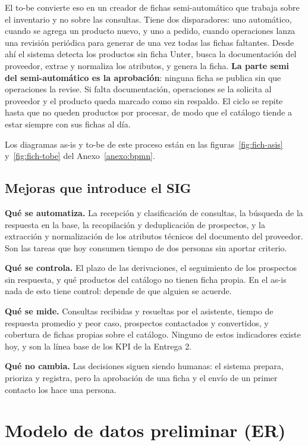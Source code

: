 \documentclass{article}
\begin{document}
El to-be convierte eso en un creador de fichas semi-automático que trabaja sobre el inventario y no sobre las consultas. Tiene dos disparadores: uno automático, cuando se agrega un producto nuevo, y uno a pedido, cuando operaciones lanza una revisión periódica para generar de una vez todas las fichas faltantes. Desde ahí el sistema detecta los productos sin ficha Unter, busca la documentación del proveedor, extrae y normaliza los atributos, y genera la ficha. \textbf{La parte semi del semi-automático es la aprobación}: ninguna ficha se publica sin que operaciones la revise. Si falta documentación, operaciones se la solicita al proveedor y el producto queda marcado como sin respaldo. El ciclo se repite hasta que no queden productos por procesar, de modo que el catálogo tiende a estar siempre con sus fichas al día.

Los diagramas as-is y to-be de este proceso están en las figuras~\ref{fig:fich-asis} y~\ref{fig:fich-tobe} del Anexo~\ref{anexo:bpmn}.

\subsection{Mejoras que introduce el SIG}

\textbf{Qué se automatiza.} La recepción y clasificación de consultas, la búsqueda de la respuesta en la base, la recopilación y deduplicación de prospectos, y la extracción y normalización de los atributos técnicos del documento del proveedor. Son las tareas que hoy consumen tiempo de dos personas sin aportar criterio.

\textbf{Qué se controla.} El plazo de las derivaciones, el seguimiento de los prospectos sin respuesta, y qué productos del catálogo no tienen ficha propia. En el as-is nada de esto tiene control: depende de que alguien se acuerde.

\textbf{Qué se mide.} Consultas recibidas y resueltas por el asistente, tiempo de respuesta promedio y peor caso, prospectos contactados y convertidos, y cobertura de fichas propias sobre el catálogo. Ninguno de estos indicadores existe hoy, y son la línea base de los KPI de la Entrega 2.

\textbf{Qué no cambia.} Las decisiones siguen siendo humanas: el sistema prepara, prioriza y registra, pero la aprobación de una ficha y el envío de un primer contacto los hace una persona.

\section{Modelo de datos preliminar (ER)}
\end{document}
